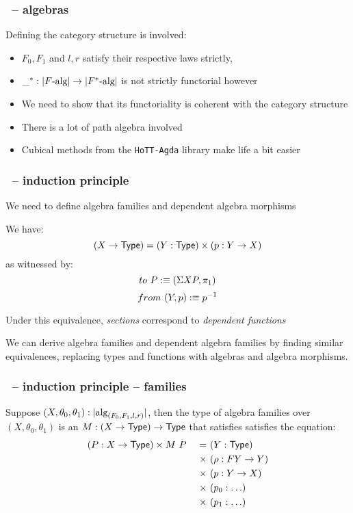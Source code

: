 \documentclass{beamer}
\begin{document}
 \begin{frame}
   \frametitle{\onehits\ -- algebras}

   Defining the category structure is involved:
   
   \begin{itemize}
   \item $F_0, F_1$ and $l, r$ satisfy their respective laws strictly,
   \item $\_^* : | F\mbox{-alg} | \to | F^*\mbox{-alg} |$ is not strictly functorial however
   \item We need to show that its functoriality is coherent with the category structure
   \item There is a lot of path algebra involved
   \item Cubical methods from the \texttt{HoTT-Agda} library make life a bit easier
   \end{itemize}

 \end{frame}

 \begin{frame}
   \frametitle{\onehits\ -- induction principle}  
   We need to define algebra families and dependent algebra morphisms

   We have:
   $$
   (X \to \mathsf{Type}) = (Y : \mathsf{Type}) \times (p : Y \to X)
   $$
   as witnessed by:
   $$
   to\ P :\equiv (\Sigma X P , \pi_1)
   $$
   $$
   from\ (Y, p) :\equiv p^{-1}
   $$
   
   Under this equivalence, \emph{sections} correspond to
   \emph{dependent functions}

   \vfill
   We can derive algebra families and dependent algebra families by
   finding similar equivalences, replacing types and functions with
   algebras and algebra morphisms.
 \end{frame}

 \begin{frame}
   \frametitle{\onehits\ -- induction principle -- families}
   Suppose $(X,\theta_0,\theta_1) : | \mbox{alg}_{(F_0,F_1,l,r)} |$, then
   the type of algebra families over $(X,\theta_0,\theta_1)$ is an
   $M : (X \to \mathsf{Type}) \to \mathsf{Type}$ that satisfies satisfies the
   equation:
   \begin{alignat*}{2}
   (P : X \to \mathsf{Type}) \times M\ P &\ &=\      &(Y : \mathsf{Type}) \\
                                 &\ &\times\ &(\rho : FY \to Y) \\
                                 &\ &\times\ &(p : Y \to X) \\
                                 &\ &\times\ &(p_0 : \hdots) \\
                                 &\ &\times\ &(p_1 : \hdots)
   \end{alignat*}
 \end{frame}
\end{document}
